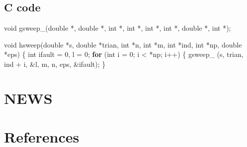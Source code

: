 \documentclass[]{article}
\newenvironment{Shaded}{\begin{snugshade}}{\end{snugshade}}
\newcommand{\KeywordTok}[1]{\textcolor[rgb]{0.13,0.29,0.53}{\textbf{{#1}}}}
\newcommand{\DataTypeTok}[1]{\textcolor[rgb]{0.13,0.29,0.53}{{#1}}}
\newcommand{\DecValTok}[1]{\textcolor[rgb]{0.00,0.00,0.81}{{#1}}}
\newcommand{\NormalTok}[1]{{#1}}
\begin{document}
\subsection{C code}\label{c-code}

\begin{Shaded}
\begin{Highlighting}[]
\DataTypeTok{void} \NormalTok{gsweep_(}\DataTypeTok{double} \NormalTok{*, }\DataTypeTok{double} \NormalTok{*, }\DataTypeTok{int} \NormalTok{*, }\DataTypeTok{int} \NormalTok{*, }\DataTypeTok{int} \NormalTok{*, }\DataTypeTok{int} \NormalTok{*, }\DataTypeTok{double} \NormalTok{*, }\DataTypeTok{int} \NormalTok{*);}

\DataTypeTok{void}
\NormalTok{hsweep(}\DataTypeTok{double} \NormalTok{*s, }\DataTypeTok{double} \NormalTok{*trian, }\DataTypeTok{int} \NormalTok{*n, }\DataTypeTok{int} \NormalTok{*m, }\DataTypeTok{int} \NormalTok{*ind, }\DataTypeTok{int} \NormalTok{*np, }\DataTypeTok{double} \NormalTok{*eps) \{}
    \DataTypeTok{int} \NormalTok{ifault = }\DecValTok{0}\NormalTok{, l = }\DecValTok{0}\NormalTok{;}
    \KeywordTok{for} \NormalTok{(}\DataTypeTok{int} \NormalTok{i = }\DecValTok{0}\NormalTok{; i < *np; i++) \{}
        \NormalTok{gsweep_ (s, trian, ind + i, &l, m, n, eps, &ifault);}
    \NormalTok{\}}
\end{Highlighting}
\end{Shaded}

\section{NEWS}\label{news}

\section*{References}\label{references}

\hypertarget{refs}{}
\end{document}
